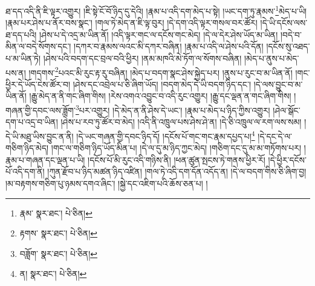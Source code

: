ཐ་དད་འདི་ནི་ཇི་ལྟར་འགྱུར། །ཇི་སྟེ་ངོ་བོ་ཉིད་དུ་དེའི། །རྣམ་པ་འདི་དག་མེད་པ་སྟེ། །ཡང་དག་ཏུ་རྣམས་\footnote{རྣམ་  སྣར་ཐང་།  པེ་ཅིན། }མེད་པ་ཡི། །རྣམ་པར་ཤེས་པ་ནོར་བས་སྣང་། །གལ་ཏེ་མེད་ན་ཇི་ལྟ་བུར། །དེ་དག་འདི་ལྟར་གསལ་བར་ཚོར། །དེ་ཡི་དངོས་ལས་ཐ་དད་པའི། །ཤེས་པ་དེ་འདྲ་མ་ཡིན་ནོ། །འདི་ལྟར་གང་ལ་དངོས་གང་མེད། །དེ་ལ་དེར་ཤེས་ཡོད་མ་ཡིན། །བདེ་བ་མིན་ལ་བདེ་སོགས་དང་། །དཀར་བ་རྣམས་ལའང་མི་དཀར་བཞིན། །རྣམ་པ་འདི་ལ་ཤེས་པའི་དོན། །དངོས་སུ་འཐད་པ་མ་ཡིན་ཏེ། །ཤེས་པའི་བདག་དང་བྲལ་བའི་ཕྱིར། །ནམ་མཁའི་མེ་ཏོག་ལ་སོགས་བཞིན། །མེད་པ་ནུས་པ་མེད་པས་ན། །གདགས་\footnote{རྟགས་  སྣར་ཐང་།  པེ་ཅིན། }པའང་མི་རུང་རྟ་རུ་བཞིན། །མེད་པ་བདག་སྣང་ཤེས་སྐྱེད་པར། །ནུས་པ་རུང་བ་མ་ཡིན་ནོ། །གང་ཕྱིར་དེ་ཡོད་ངེས་ཚོར་བ། །ཤེས་དང་འབྲེལ་པ་ཅི་ཞིག་ཡོད། །བདག་མེད་དེ་ཡི་བདག་ཉིད་དང་། །དེ་ལས་བྱུང་བ་མ་ཡིན་ནོ། །རྒྱུ་མེད་ན་ནི་གང་ཞིག་གིས། །རེས་འགའ་འབྱུང་བ་འདི་རུང་འགྱུར། །རྒྱུ་དང་ལྡན་ན་གང་ཞིག་གིས། །གཞན་གྱི་དབང་ལས་ཟློག་\footnote{བཟློག་  སྣར་ཐང་།  པེ་ཅིན། }པར་འགྱུར། །དེ་མེད་ན་ནི་ཤེས་དེ་ཡང་། །རྣམ་པ་མེད་པ་ཉིད་ཀྱིས་འགྱུར། །ཤེལ་སྒོང་དག་པ་འདྲ་བ་ཡིན། །ཤེས་པ་རབ་ཏུ་ཚོར་བ་མེད། །འདི་ནི་འཁྲུལ་པས་ཤེས་ཤེ་ན། །དེ་ཅི་འཁྲུལ་ལ་རག་ལས་སམ། །དེ་ཡི་མཐུ་ཡིས་བྱུང་ན་ནི། །དེ་ཡང་གཞན་གྱི་དབང་ཉིད་དོ། །དངོས་པོ་གང་གང་རྣམ་དཔྱད་པ།\footnote{ན།  སྣར་ཐང་།  པེ་ཅིན། } །དེ་དང་དེ་ལ་གཅིག་ཉིད་མེད། །གང་ལ་གཅིག་ཉིད་ཡོད་མིན་པ། །དེ་ལ་དུ་མ་ཉིད་ཀྱང་མེད། །གཅིག་དང་དུ་མ་མ་གཏོགས་པར། །རྣམ་པ་གཞན་དང་ལྡན་པ་ཡི། །དངོས་པོ་མི་རུང་འདི་གཉིས་ནི། །ཕན་ཚུན་སྤངས་ཏེ་གནས་ཕྱིར་རོ། །དེ་ཕྱིར་དངོས་པོ་འདི་དག་ནི། །ཀུན་རྫོབ་པ་ཉིད་མཚན་ཉིད་འཛིན། །གལ་ཏེ་འདི་དག་དོན་འདོད་ན། །དེ་ལ་བདག་གིས་ཅི་ཞིག་བྱ། །མ་བརྟགས་གཅིག་པུ་ཉམས་དགའ་ཞིང་། །སྐྱེ་དང་འཇིག་པའི་ཆོས་ཅན་པ། །
